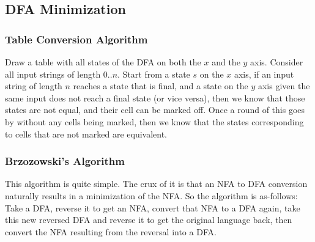 \subsection{DFA Minimization}

    \subsubsection{Table Conversion Algorithm}
    Draw a table with all states of the DFA on both the $x$ and the $y$ axis.
    Consider all input strings of length $0..n$. Start from a state $s$ on
    the $x$ axis, if an input string of length $n$ reaches a state that is final,
    and a state on the $y$ axis given the same input does not reach a final state
    (or vice versa), then we know that those states are not equal, and their cell
    can be marked off. Once a round of this goes by without any cells being
    marked, then we know that the states corresponding to cells that
    are not marked are equivalent.

    \subsubsection{Brzozowski's Algorithm}
    This algorithm is quite simple. The crux of it is that an NFA to DFA conversion
    naturally results in a minimization of the NFA. So the algorithm is as-follows:
    Take a DFA, reverse it to get an NFA, convert that NFA to a DFA again, take
    this new reversed DFA and reverse it to get the original language back, then
    convert the NFA resulting from the reversal into a DFA.
